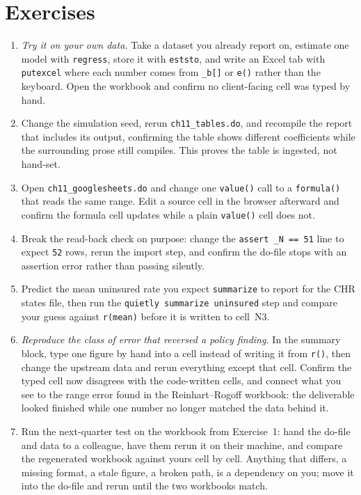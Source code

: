 \section*{Exercises}
\begin{enumerate}
\item \emph{Try it on your own data.} Take a dataset you already report on, estimate one model with \texttt{regress}, store it with \texttt{eststo}, and write an Excel tab with \texttt{putexcel} where each number comes from \texttt{\_b[]} or \texttt{e()} rather than the keyboard. Open the workbook and confirm no client-facing cell was typed by hand.
\item Change the simulation seed, rerun \texttt{ch11\_tables.do}, and recompile the report that includes its output, confirming the table shows different coefficients while the surrounding prose still compiles. This proves the table is ingested, not hand-set.
\item Open \texttt{ch11\_googlesheets.do} and change one \texttt{value()} call to a \texttt{formula()} that reads the same range. Edit a source cell in the browser afterward and confirm the formula cell updates while a plain \texttt{value()} cell does not.
\item Break the read-back check on purpose: change the \texttt{assert \_N == 51} line to expect \texttt{52} rows, rerun the import step, and confirm the do-file stops with an assertion error rather than passing silently.
\item Predict the mean uninsured rate you expect \texttt{summarize} to report for the CHR states file, then run the \texttt{quietly summarize uninsured} step and compare your guess against \texttt{r(mean)} before it is written to cell~N3.
\item \emph{Reproduce the class of error that reversed a policy finding.} In the summary block, type one figure by hand into a cell instead of writing it from \texttt{r()}, then change the upstream data and rerun everything except that cell. Confirm the typed cell now disagrees with the code-written cells, and connect what you see to the range error \textcite{herndon2014debt} found in the Reinhart--Rogoff workbook: the deliverable looked finished while one number no longer matched the data behind it.
\item Run the next-quarter test on the workbook from Exercise~1: hand the do-file and data to a colleague, have them rerun it on their machine, and compare the regenerated workbook against yours cell by cell. Anything that differs, a missing format, a stale figure, a broken path, is a dependency on you; move it into the do-file and rerun until the two workbooks match.
\end{enumerate}
